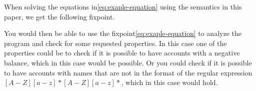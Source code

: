When solving the equations in\ref{eq:exaple-equation} using the semantics in this paper, we get the following fixpoint.



You would then be able to use the fixpoint\ref{eq:exaple-equation} to analyze the program and check for some requested properties.
In this case one of the properties could be to check if it is possible to have accounts with a negative balance, which in this case would be possible.
Or you could check if it is possible to have accounts with names that are not in the format of the regular expression $[A-Z][a-z]* [A-Z][a-z]*$, which in this case would hold.